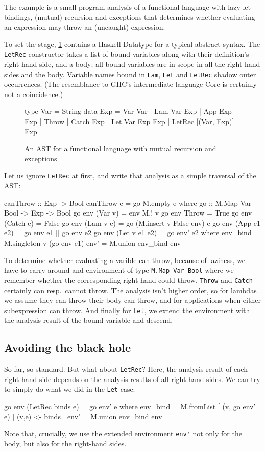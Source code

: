 \documentclass[manuscript,anonymous,screen,acmsmall]{acmart}
\begin{document}
The example is a small program analysis of a functional language with lazy let-bindings, (mutual) recursion and exceptions that determines whether evaluating an expression may throw an (uncaught) expression.

To set the stage, \cref{fig:analast} contains a Haskell Datatype for a typical abstract syntax. The \verb|LetRec| constructor takes a list of bound variables along with their definition's  right-hand side, and a body; all bound variables are in scope in all the right-hand sides and the body.
Variable names bound in \verb|Lam|, \verb|Let| and \verb|LetRec| shadow outer occurrences. (The resemblance to GHC's intermediate language Core \citep{secrets} is certainly not a coincidence.)

\begin{figure}
\begin{code}
type Var  =  String
data Exp  =  Var Var | Lam Var Exp | App Exp Exp | Throw | Catch Exp
          |  Let Var Exp Exp | LetRec [(Var, Exp)] Exp
\end{code}
\caption{An AST for a functional language with mutual recursion and exceptions}
\label{fig:analast}
\end{figure}

Let us ignore \verb|LetRec| at first, and write that analysis as a simple traversal of the AST:
\begin{code}
canThrow :: Exp -> Bool
canThrow e = go M.empty e
  where
    go :: M.Map Var Bool -> Exp -> Bool
    go env (Var v)        = env M.! v
    go env Throw          = True
    go env (Catch e)      = False
    go env (Lam v e)      = go (M.insert v False env) e
    go env (App e1 e2)    = go env e1 || go env e2
    go env (Let v e1 e2)  = go env' e2
      where
        env_bind  = M.singleton v (go env e1)
        env'      = M.union env_bind env
\end{code}

To determine whether evaluating a varible can throw, because of laziness, we have to carry around and
environment of type \verb|M.Map Var Bool| where we remember whether the corresponding right-hand could throw. \verb|Throw| and \verb|Catch| certainly can resp.\ cannot throw. The analysis isn't higher order, so for lambdas we assume they can throw their body can throw, and for applications when either subexpression can throw. And finally for \verb|Let|, we extend the environment with the analysis result of the bound variable and descend.

\subsection{Avoiding the black hole}
So far, so standard. But what about \verb|LetRec|? Here, the analysis result of each right-hand side depends on the analysis results of all right-hand sides. We can try to simply do what we did in the \verb|Let| case:
\begin{code}
    go env (LetRec binds e) = go env' e
      where
        env_bind  = M.fromList [ (v, go env' e) | (v,e) <- binds ]
        env'      = M.union env_bind env
\end{code}
Note that, crucially, we use the extended environment \verb|env'| not only for the body, but also for the right-hand sides.
\end{document}
